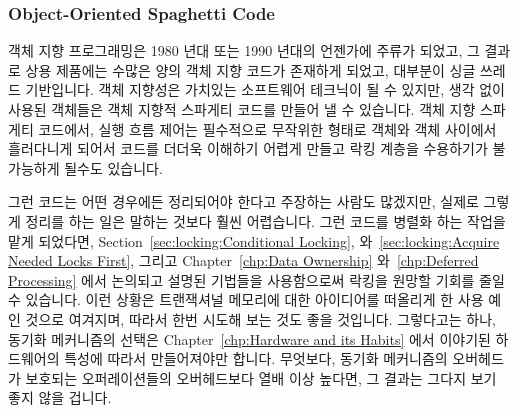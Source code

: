 \subsubsection{Object-Oriented Spaghetti Code}
\label{sec:locking:Object-Oriented Spaghetti Code}

객체 지향 프로그래밍은 1980 년대 또는 1990 년대의 언젠가에 주류가 되었고, 그
결과로 상용 제품에는 수많은 양의 객체 지향 코드가 존재하게 되었고, 대부분이
싱글 쓰레드 기반입니다.
객체 지향성은 가치있는 소프트웨어 테크닉이 될 수 있지만, 생각 없이 사용된
객체들은 객체 지향적 스파게티 코드를 만들어 낼 수 있습니다.
객체 지향 스파게티 코드에서, 실행 흐름 제어는 필수적으로 무작위한 형태로 객체와
객체 사이에서 흘러다니게 되어서 코드를 더더욱 이해하기 어렵게 만들고 락킹
계층을 수용하기가 불가능하게 될수도 있습니다.

그런 코드는 어떤 경우에든 정리되어야 한다고 주장하는 사람도 많겠지만, 실제로
그렇게 정리를 하는 일은 말하는 것보다 훨씬 어렵습니다.
그런 코드를 병렬화 하는 작업을 맡게 되었다면, 
Section~\ref{sec:locking:Conditional Locking},
와~\ref{sec:locking:Acquire Needed Locks First},
그리고
Chapter~\ref{chp:Data Ownership}
와~\ref{chp:Deferred Processing} 에서 논의되고 설명된 기법들을 사용함으로써
락킹을 원망할 기회를 줄일 수 있습니다.
이런 상황은 트랜잭셔널 메모리에 대한 아이디어를 떠올리게 한 사용 예인 것으로
여겨지며, 따라서 한번 시도해 보는 것도 좋을 것입니다.
그렇다고는 하나, 동기화 메커니즘의 선택은
Chapter~\ref{chp:Hardware and its Habits} 에서 이야기된 하드웨어의 특성에
따라서 만들어져야만 합니다.
무엇보다, 동기화 메커니즘의 오버헤드가 보호되는 오퍼레이션들의 오버헤드보다
열배 이상 높다면, 그 결과는 그다지 보기 좋지 않을 겁니다.

